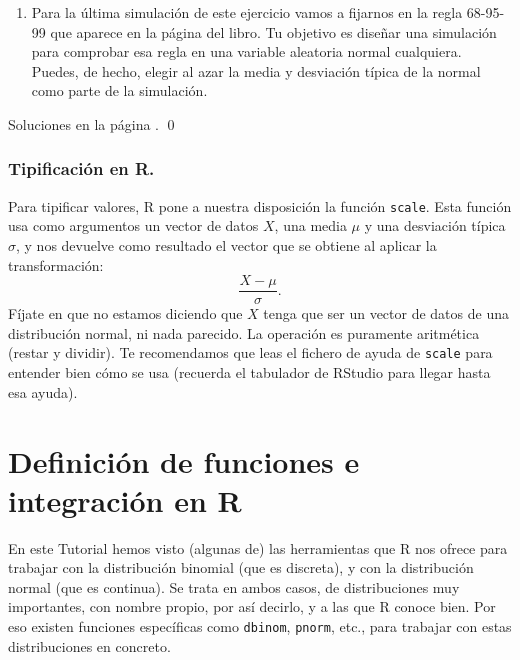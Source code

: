 \documentclass[10pt,a4paper]{article}\usepackage[]{graphicx}\usepackage[]{color}
\newcounter{cont01}
\begin{document}
\begin{ejercicio}
\begin{enumerate}
\begin{enumerate}
  \item Para la última simulación de este ejercicio vamos a fijarnos en la regla 68-95-99 que aparece en la página \pageref{curso-cap05:ecu:Regla68-95-99Normales} del libro. Tu objetivo es diseñar una simulación para comprobar esa regla en una variable aleatoria normal cualquiera. Puedes, de hecho, elegir al azar la media y desviación típica de la normal como parte de la simulación.
        \end{enumerate}

\end{enumerate}
Soluciones en la página \pageref{tut05:ejercicio24:sol}.
\qed
\end{ejercicio}


\subsubsection{Tipificación en R.}
\label{tut05:subsubsec:TipificacionR}

Para tipificar valores, R pone a nuestra disposición la función {\tt scale}. Esta función usa como argumentos un vector de datos $X$, una media $\mu$ y una desviación típica $\sigma$, y nos devuelve como resultado el vector que se obtiene al aplicar la transformación:
\[\dfrac{X-\mu}{\sigma}.\]
Fíjate en que no estamos diciendo que $X$ tenga que ser un vector de datos de una distribución normal, ni nada parecido. La operación es puramente aritmética (restar y dividir). Te recomendamos que leas el fichero de ayuda de {\tt scale} para entender bien cómo se usa (recuerda el tabulador de RStudio para llegar hasta esa ayuda).


\section{Definición de funciones e integración en R}
\label{tut05:sec:FuncionesIntegracionR}

En este Tutorial hemos visto (algunas de) las herramientas que R nos ofrece para trabajar con la distribución binomial (que es discreta), y con la distribución normal (que es continua). Se trata en ambos casos, de distribuciones muy importantes, con nombre propio, por así decirlo, y a las que R conoce bien. Por eso existen funciones específicas como {\tt dbinom}, {\tt pnorm}, etc., para trabajar con estas distribuciones en concreto.
\end{document}

